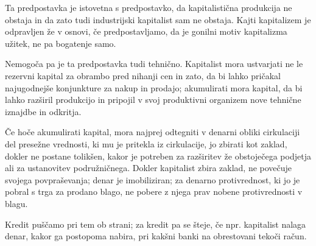 \documentclass[kapital_02.tex]{subfiles}
\begin{document}
Ta predpostavka je istovetna s predpostavko, da kapitalistična produkcija ne obstaja in da zato tudi industrijski kapitalist sam ne obstaja. Kajti kapitalizem je odpravljen že v osnovi, če predpostavljamo, da je gonilni motiv kapitalizma užitek, ne pa bogatenje samo.

Nemogoča pa je ta predpostavka tudi tehnično. Kapitalist mora ustvarjati ne le rezervni kapital za obrambo pred nihanji cen in zato, da bi lahko pričakal najugodnejše konjunkture za nakup in prodajo; akumulirati mora kapital, da bi lahko razširil produkcijo in pripojil v svoj produktivni organizem nove tehnične iznajdbe in odkritja.

Če \KPEstran hoče akumulirati kapital, mora najprej odtegniti v denarni obliki cirkulaciji del presežne vrednosti, ki mu je pritekla iz cirkulacije, jo zbirati kot zaklad, dokler ne postane tolikšen, kakor je potreben za razširitev že obstoječega podjetja ali za ustanovitev podružničnega. Dokler kapitalist zbira zaklad, ne povečuje svojega povpraševanja; denar je imobiliziran; za denarno protivrednost, ki jo je pobral s trga za prodano blago, ne pobere z njega prav nobene protivrednosti v blagu.

Kredit puščamo pri tem ob strani; za kredit pa se šteje, če npr. kapitalist nalaga denar, kakor ga postopoma nabira, pri kakšni banki na obrestovani tekoči račun.
 
\end{document}
